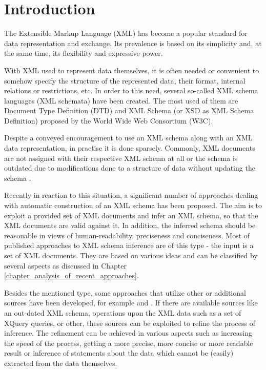 \chapter{Introduction}
The Extensible Markup Language (XML) \cite{Bray:08:EML} has become a popular standard for data representation and exchange. Its prevalence is based on its simplicity and, at the same time, its flexibility and expressive power.

With XML used to represent data themselves, it is often needed or convenient to somehow specify the structure of the represented data, their format, internal relations or restrictions, etc. In order to this need, several so-called XML schema languages (XML schemata) have been created. The most used of them are Document Type Definition (DTD) \cite{Bray:08:EML} and XML Schema (or XSD as XML Schema Definition) \cite{Walmsley:04:XSP, Thompson:04:XSP, Malhotra:04:XSP} proposed by the World Wide Web Consortium (W3C).

Despite a conveyed encouragement to use an XML schema along with an XML data representation, in practise it is done sparsely. Commonly, XML documents are not assigned with their respective XML schema at all or the schema is outdated due to modifications done to a structure of data without updating the schema \cite{Mlynkova:2008:AAX:1494650.1495496}.

Recently in reaction to this situation, a significant number of approaches dealing with automatic construction of an XML schema has been proposed. The aim is to exploit a provided set of XML documents and infer an XML schema, so that the XML documents are valid against it. In addition, the inferred schema should be reasonable in views of human-readability, preciseness and conciseness. Most of published approaches to XML schema inference are of this type - the input is a set of XML documents. They are based on various ideas and can be classified by several aspects as discussed in Chapter \ref{chapter_analysis_of_recent_approaches}.

Besides the mentioned type, some approaches that utilize other or additional sources have been developed, for example \cite{Mlynkova:2009:IXS:1862681.1862693} and \cite{thesis_klempa}. If there are available sources like an out-dated XML schema, operations upon the XML data such as a set of XQuery \cite{w3c_xquery} queries, or other, these sources can be exploited to refine the process of inference. The refinement can be achieved in various aspects such as increasing the speed of the process, getting a more precise, more concise or more readable result or inference of statements about the data which cannot be (easily) extracted from the data themselves.

